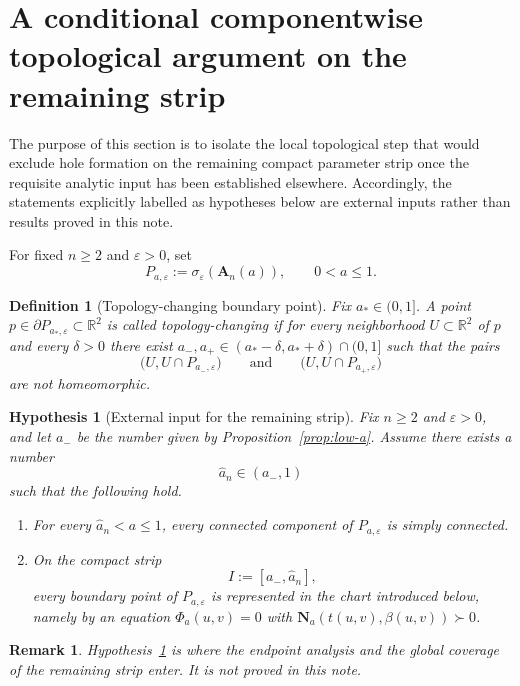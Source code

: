 \documentclass[11pt]{article}
\newtheorem{remark}[theorem]{Remark}
\newtheorem{definition}[theorem]{Definition}
\newtheorem{hypothesis}[theorem]{Hypothesis}
\newcommand{\R}{\mathbb{R}}
\begin{document}
\section{A conditional componentwise topological argument on the remaining strip}

The purpose of this section is to isolate the local topological step that would exclude hole formation on the remaining compact parameter strip once the requisite analytic input has been established elsewhere. Accordingly, the statements explicitly labelled as hypotheses below are external inputs rather than results proved in this note.

For fixed \(n\ge 2\) and \(\varepsilon>0\), set
\[
P_{a,\varepsilon}:=\sigma_\varepsilon(\mathbf A_n(a)),
\qquad 0<a\le 1.
\]

\begin{definition}[Topology-changing boundary point]\label{def:topology-changing}
Fix \(a_*\in(0,1]\). A point \(p\in \partial P_{a_*,\varepsilon}\subset\R^2\) is called \emph{topology-changing} if for every neighborhood \(U\subset\R^2\) of \(p\) and every \(\delta>0\) there exist \(a_-,a_+\in (a_* -\delta,a_*+\delta)\cap(0,1]\) such that the pairs
\[
\bigl(U,U\cap P_{a_-,\varepsilon}\bigr)
\qquad\text{and}\qquad
\bigl(U,U\cap P_{a_+,\varepsilon}\bigr)
\]
are not homeomorphic.
\end{definition}

\begin{hypothesis}[External input for the remaining strip]\label{hyp:standing-input}
Fix \(n\ge 2\) and \(\varepsilon>0\), and let \(a_-\) be the number given by
Proposition~\ref{prop:low-a}. Assume there exists a number
\[
\widehat a_n\in(a_-,1)
\]
such that the following hold.

\begin{enumerate}
\item For every \(\widehat a_n<a\le 1\), every connected component of \(P_{a,\varepsilon}\) is simply connected.

\item On the compact strip
\[
I:=[a_-,\widehat a_n],
\]
every boundary point of \(P_{a,\varepsilon}\) is represented in the chart introduced below, namely by an equation \(\Phi_a(u,v)=0\) with \(\mathbf N_a(t(u,v),\beta(u,v))\succ 0\).
\end{enumerate}
\end{hypothesis}

\begin{remark}
Hypothesis~\ref{hyp:standing-input} is where the endpoint analysis and the global coverage of the remaining strip enter. It is not proved in this note.
\end{remark}
\end{document}
